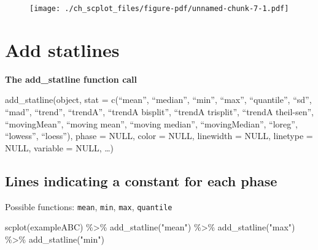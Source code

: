 \documentclass[
  letterpaper,
  DIV=11,
  numbers=noendperiod]{scrreprt}
\newenvironment{Shaded}{\begin{snugshade}}{\end{snugshade}}
\newcommand{\FunctionTok}[1]{\textcolor[rgb]{0.28,0.35,0.67}{#1}}
\newcommand{\NormalTok}[1]{\textcolor[rgb]{0.00,0.23,0.31}{#1}}
\newcommand{\SpecialCharTok}[1]{\textcolor[rgb]{0.37,0.37,0.37}{#1}}
\newcommand{\StringTok}[1]{\textcolor[rgb]{0.13,0.47,0.30}{#1}}
\begin{document}
\begin{figure}[H]

{\centering \texttt{[image: ./ch\_scplot\_files/figure-pdf/unnamed-chunk-7-1.pdf]}

}

\end{figure}

\hypertarget{add-statlines}{%
\section{Add statlines}\label{add-statlines}}

\begin{tcolorbox}[enhanced jigsaw, breakable, rightrule=.15mm, bottomrule=.15mm, arc=.35mm, colback=white, colframe=quarto-callout-tip-color-frame, opacityback=0, leftrule=.75mm, toprule=.15mm, left=2mm]
\begin{minipage}[t]{5.5mm}
\textcolor{quarto-callout-tip-color}{\faLightbulb}
\end{minipage}%
\begin{minipage}[t]{\textwidth - 5.5mm}

\textbf{The add\_statline function call}\vspace{2mm}

add\_statline(object, stat = c(``mean'', ``median'', ``min'', ``max'',
``quantile'', ``sd'', ``mad'', ``trend'', ``trendA'', ``trendA
bisplit'', ``trendA trisplit'', ``trendA theil-sen'', ``movingMean'',
``moving mean'', ``moving median'', ``movingMedian'', ``loreg'',
``lowess'', ``loess''), phase = NULL, color = NULL, linewidth = NULL,
linetype = NULL, variable = NULL, \ldots)

\end{minipage}%
\end{tcolorbox}

\hypertarget{lines-indicating-a-constant-for-each-phase}{%
\subsection{Lines indicating a constant for each
phase}\label{lines-indicating-a-constant-for-each-phase}}

Possible functions: \texttt{mean}, \texttt{min}, \texttt{max},
\texttt{quantile}

\begin{Shaded}
\begin{Highlighting}[]
\FunctionTok{scplot}\NormalTok{(exampleABC) }\SpecialCharTok{\%\textgreater{}\%}
  \FunctionTok{add\_statline}\NormalTok{(}\StringTok{"mean"}\NormalTok{) }\SpecialCharTok{\%\textgreater{}\%}
  \FunctionTok{add\_statline}\NormalTok{(}\StringTok{"max"}\NormalTok{) }\SpecialCharTok{\%\textgreater{}\%}
  \FunctionTok{add\_statline}\NormalTok{(}\StringTok{"min"}\NormalTok{)}
\end{Highlighting}
\end{Shaded}
\end{document}
